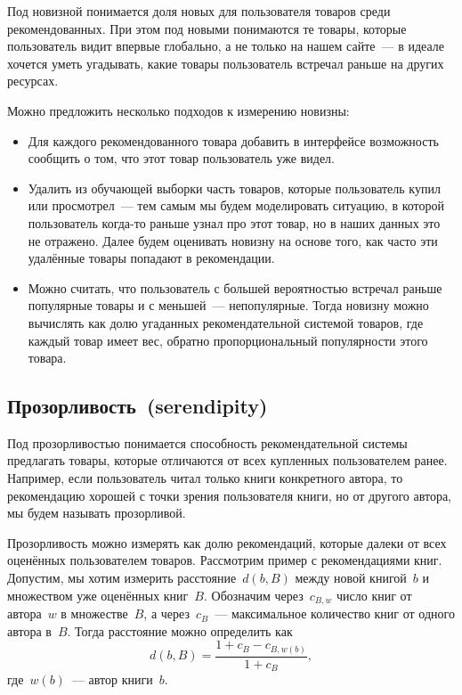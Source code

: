 \documentclass[12pt,fleqn]{article}
\begin{document}
Под новизной понимается доля новых для пользователя товаров среди рекомендованных.
При этом под новыми понимаются те товары, которые пользователь видит впервые глобально,
а не только на нашем сайте~--- в идеале хочется уметь угадывать, какие товары пользователь
встречал раньше на других ресурсах.

Можно предложить несколько подходов к измерению новизны:
\begin{itemize}
    \item Для каждого рекомендованного товара добавить в интерфейсе возможность
        сообщить о том, что этот товар пользователь уже видел.
    \item Удалить из обучающей выборки часть товаров, которые пользователь купил или просмотрел~---
        тем самым мы будем моделировать ситуацию, в которой пользователь когда-то раньше
        узнал про этот товар, но в наших данных это не отражено.
        Далее будем оценивать новизну на основе того, как часто эти удалённые товары попадают
        в рекомендации.
    \item Можно считать, что пользователь с большей вероятностью встречал раньше популярные товары
        и с меньшей~--- непопулярные.
        Тогда новизну можно вычислять как долю угаданных рекомендательной системой товаров,
        где каждый товар имеет вес, обратно пропорциональный популярности этого товара.
\end{itemize}

\subsection{Прозорливость~(serendipity)}



Под прозорливостью понимается способность рекомендательной системы предлагать товары,
которые отличаются от всех купленных пользователем ранее.
Например, если пользователь читал только книги конкретного автора,
то рекомендацию хорошей с точки зрения пользователя книги, но от другого автора,
мы будем называть прозорливой.

Прозорливость можно измерять как долю рекомендаций, которые далеки от всех оценённых пользователем товаров.
Рассмотрим пример с рекомендациями книг.
Допустим, мы хотим измерить расстояние~$d(b, B)$ между новой книгой~$b$ и множеством уже оценённых книг~$B$.
Обозначим через~$c_{B, w}$ число книг от автора~$w$ в множестве~$B$,
а через~$c_B$~--- максимальное количество книг от одного автора в~$B$.
Тогда расстояние можно определить как
\[
    d(b, B) = \frac{1 + c_B - c_{B, w(b)}}{1 + c_B},
\]
где~$w(b)$~--- автор книги~$b$.
\end{document}
